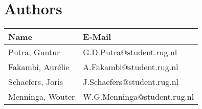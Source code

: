 \section*{Authors}

\begin{tabular}{L{} L{}}
	\textbf{Name}        & \textbf{E-Mail}               \\ \toprule
	Putra, Guntur        & G.D.Putra@student.rug.nl      \\
	Fakambi, Aur\'{e}lie & A.Fakambi@student.rug.nl      \\
	Schaefers, Joris     & J.Schaefers@student.rug.nl    \\
	Menninga, Wouter     & W.G.Menninga@student.rug.nl   \\ 
\end{tabular}

